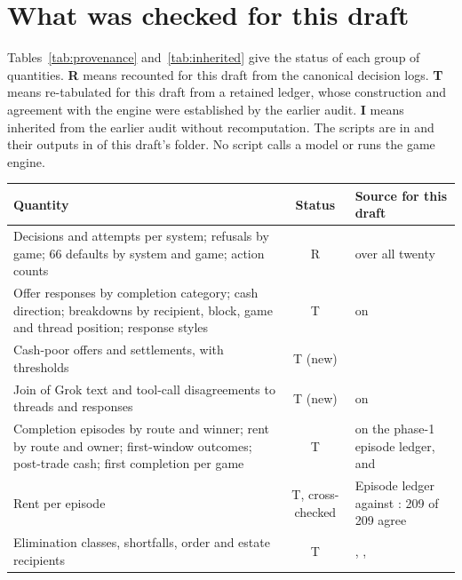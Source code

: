\section{What was checked for this draft}
\label{app:provenance}

Tables~\ref{tab:provenance} and~\ref{tab:inherited} give the status of each group of quantities. \textbf{R} means recounted for this draft from the canonical decision logs. \textbf{T} means re-tabulated for this draft from a retained ledger, whose construction and agreement with the engine were established by the earlier audit. \textbf{I} means inherited from the earlier audit without recomputation. The scripts are in  and their outputs in  of this draft's folder. No script calls a model or runs the game engine.

\begin{table}[H]
\centering\footnotesize
\renewcommand{\arraystretch}{1.1}
\begin{tabularx}{\linewidth}{@{}YcL{5.6cm}@{}}
\toprule
Quantity & Status & Source for this draft\\
\midrule
Decisions and attempts per system; refusals by game; 66 defaults by system and game; action counts & R &  over all twenty \\
Offer responses by completion category; cash direction; breakdowns by recipient, block, game and thread position; response styles & T &  on \\
Cash-poor offers and settlements, with thresholds & T (new) & \\
Join of Grok text and tool-call disagreements to threads and responses & T (new) &  on \\
Completion episodes by route and winner; rent by route and owner; first-window outcomes; post-trade cash; first completion per game & T &  on the phase-1 episode ledger,  and \\
Rent per episode & T, cross-checked & Episode ledger against : 209 of 209 agree\\
Elimination classes, shortfalls, order and estate recipients & T & , , \\

\end{tabularx}
\end{table}
